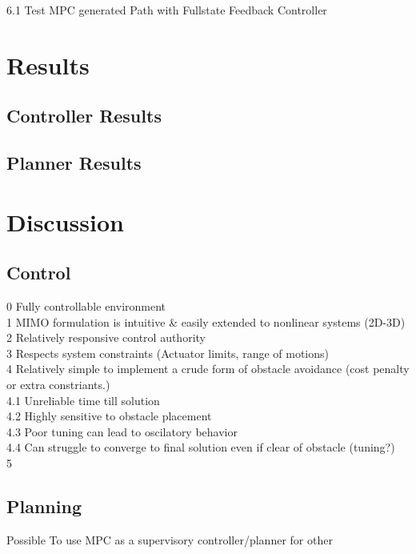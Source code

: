 \documentclass[journal]{IEEEtran}
\begin{document}
6.1 Test MPC generated Path with Fullstate Feedback Controller


\section{Results}

\subsection{Controller Results}




\subsection{Planner Results}


\section{Discussion}

\subsection{Control}

0 Fully controllable environment \\
1 MIMO formulation is intuitive \& easily extended to nonlinear systems (2D-3D)\\
2 Relatively responsive control authority\\
3 Respects system constraints (Actuator limits, range of motions)\\
4 Relatively simple to implement a crude form of obstacle avoidance (cost penalty or extra constriants.)\\
    4.1 Unreliable time till solution\\
    4.2 Highly sensitive to obstacle placement\\
    4.3 Poor tuning can lead to oscilatory behavior\\
    4.4 Can struggle to converge to final solution even if clear of obstacle (tuning?)\\
5

\subsection{Planning}

Possible To use MPC as a supervisory controller/planner for other\\
\end{document}
